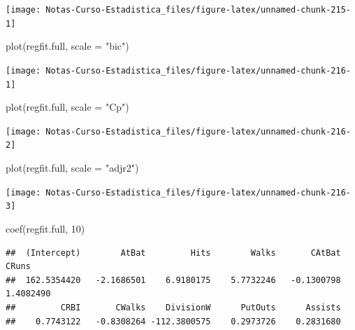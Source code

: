 \documentclass[
  12pt,
]{book}
\newenvironment{Shaded}{\begin{snugshade}}{\end{snugshade}}
\newcommand{\AttributeTok}[1]{\textcolor[rgb]{0.77,0.63,0.00}{#1}}
\newcommand{\DecValTok}[1]{\textcolor[rgb]{0.00,0.00,0.81}{#1}}
\newcommand{\FunctionTok}[1]{\textcolor[rgb]{0.00,0.00,0.00}{#1}}
\newcommand{\NormalTok}[1]{#1}
\newcommand{\StringTok}[1]{\textcolor[rgb]{0.31,0.60,0.02}{#1}}
\begin{document}
\begin{center}\texttt{[image: Notas-Curso-Estadistica\_files/figure-latex/unnamed-chunk-215-1]} \end{center}

\begin{Shaded}
\begin{Highlighting}[]
\FunctionTok{plot}\NormalTok{(regfit.full, }\AttributeTok{scale =} \StringTok{"bic"}\NormalTok{)}
\end{Highlighting}
\end{Shaded}

\begin{center}\texttt{[image: Notas-Curso-Estadistica\_files/figure-latex/unnamed-chunk-216-1]} \end{center}

\begin{Shaded}
\begin{Highlighting}[]
\FunctionTok{plot}\NormalTok{(regfit.full, }\AttributeTok{scale =} \StringTok{"Cp"}\NormalTok{)}
\end{Highlighting}
\end{Shaded}

\begin{center}\texttt{[image: Notas-Curso-Estadistica\_files/figure-latex/unnamed-chunk-216-2]} \end{center}

\begin{Shaded}
\begin{Highlighting}[]
\FunctionTok{plot}\NormalTok{(regfit.full, }\AttributeTok{scale =} \StringTok{"adjr2"}\NormalTok{)}
\end{Highlighting}
\end{Shaded}

\begin{center}\texttt{[image: Notas-Curso-Estadistica\_files/figure-latex/unnamed-chunk-216-3]} \end{center}

\begin{Shaded}
\begin{Highlighting}[]
\FunctionTok{coef}\NormalTok{(regfit.full, }\DecValTok{10}\NormalTok{)}
\end{Highlighting}
\end{Shaded}

\begin{verbatim}
##  (Intercept)        AtBat         Hits        Walks       CAtBat        CRuns 
##  162.5354420   -2.1686501    6.9180175    5.7732246   -0.1300798    1.4082490 
##         CRBI       CWalks    DivisionW      PutOuts      Assists 
##    0.7743122   -0.8308264 -112.3800575    0.2973726    0.2831680
\end{verbatim}
\end{document}
